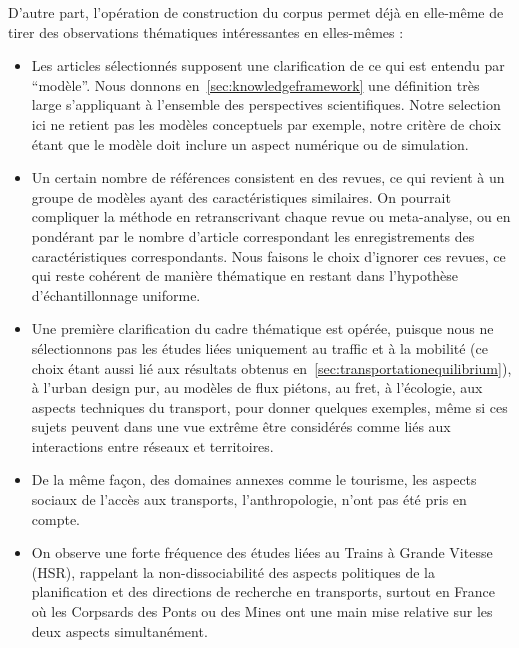 D'autre part, l'opération de construction du corpus permet déjà en elle-même de tirer des observations thématiques intéressantes en elles-mêmes :

\begin{itemize}
\item Les articles sélectionnés supposent une clarification de ce qui est entendu par ``modèle''. Nous donnons en~\ref{sec:knowledgeframework} une définition très large s'appliquant à l'ensemble des perspectives scientifiques. Notre selection ici ne retient pas les modèles conceptuels par exemple, notre critère de choix étant que le modèle doit inclure un aspect numérique ou de simulation.
\item Un certain nombre de références consistent en des revues, ce qui revient à un groupe de modèles ayant des caractéristiques similaires. On pourrait compliquer la méthode en retranscrivant chaque revue ou meta-analyse, ou en pondérant par le nombre d'article correspondant les enregistrements des caractéristiques correspondants. Nous faisons le choix d'ignorer ces revues, ce qui reste cohérent de manière thématique en restant dans l'hypothèse d'échantillonnage uniforme.
\item Une première clarification du cadre thématique est opérée, puisque nous ne sélectionnons pas les études liées uniquement au traffic et à la mobilité (ce choix étant aussi lié aux résultats obtenus en~\ref{sec:transportationequilibrium}), à l'urban design pur, au modèles de flux piétons, au fret, à l'écologie, aux aspects techniques du transport, pour donner quelques exemples, même si ces sujets peuvent dans une vue extrême être considérés comme liés aux interactions entre réseaux et territoires.
\item De la même façon, des domaines annexes comme le tourisme, les aspects sociaux de l'accès aux transports, l'anthropologie, n'ont pas été pris en compte.
\item On observe une forte fréquence des études liées au Trains à Grande Vitesse (HSR), rappelant la non-dissociabilité des aspects politiques de la planification et des directions de recherche en transports, surtout en France où les Corpsards des Ponts ou des Mines ont une main mise relative sur les deux aspects simultanément.
\end{itemize}


